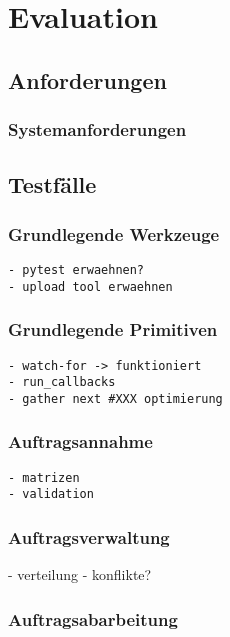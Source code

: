 \chapter{Evaluation}
\section{Anforderungen}
\subsection{Systemanforderungen}
\subsection{}


\section{Testfälle}
\subsection{Grundlegende Werkzeuge}

\begin{verbatim}
- pytest erwaehnen?
- upload tool erwaehnen
\end{verbatim}

\subsection{Grundlegende Primitiven}

\begin{verbatim}
- watch-for -> funktioniert
- run_callbacks
- gather next #XXX optimierung
\end{verbatim}

\subsection{Auftragsannahme}
\begin{verbatim}
- matrizen
- validation
\end{verbatim}

\subsection{Auftragsverwaltung}
- verteilung
- konflikte?

\subsection{Auftragsabarbeitung}

